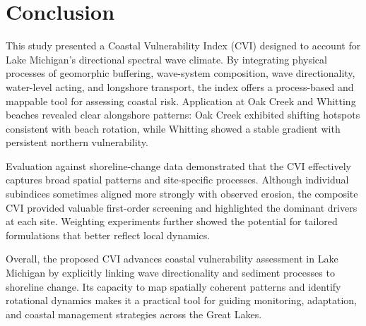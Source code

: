 \section{Conclusion}
\label{c5_Conclusion}

This study presented a Coastal Vulnerability Index (CVI) designed to account
for Lake Michigan’s directional spectral wave climate. By integrating physical
processes of geomorphic buffering, wave-system composition, wave directionality,
water-level acting, and longshore transport, the index offers a process-based
and mappable tool for assessing coastal risk. Application at Oak Creek and
Whitting beaches revealed clear alongshore patterns: Oak Creek exhibited
shifting hotspots consistent with beach rotation, while Whitting showed a stable
gradient with persistent northern vulnerability.

Evaluation against shoreline-change data demonstrated that the CVI effectively
captures broad spatial patterns and site-specific processes. Although individual
subindices sometimes aligned more strongly with observed erosion, the composite
CVI provided valuable first-order screening and highlighted the dominant drivers
at each site. Weighting experiments further showed the potential for tailored
formulations that better reflect local dynamics.

Overall, the proposed CVI advances coastal vulnerability assessment in Lake
Michigan by explicitly linking wave directionality and sediment processes to
shoreline change. Its capacity to map spatially coherent patterns and identify
rotational dynamics makes it a practical tool for guiding monitoring,
adaptation, and coastal management strategies across the Great Lakes.
